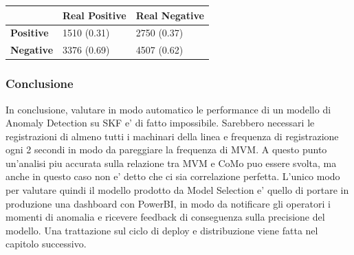 \begin{table}[]
\begin{tabular}{|l|l|l|}
\hline
                  & \textbf{Real Positive} & \textbf{Real Negative} \\ \hline
\textbf{Positive} & 1510 (0.31)            & 2750 (0.37)            \\ \hline
\textbf{Negative} & 3376 (0.69)            & 4507 (0.62)            \\ \hline
\end{tabular}
\end{table}

\subsubsection{Conclusione}
In conclusione, valutare in modo automatico le performance di un modello di Anomaly Detection su SKF e' di fatto impossibile. Sarebbero necessari le registrazioni di almeno tutti i machinari della linea e frequenza di registrazione ogni 2 secondi in modo da pareggiare la frequenza di MVM. A questo punto un'analisi piu accurata sulla relazione tra MVM e CoMo puo essere svolta, ma anche in questo caso non e' detto che ci sia correlazione perfetta.
L'unico modo per valutare quindi il modello prodotto da Model Selection e' quello di portare in produzione una dashboard con PowerBI, in modo da notificare gli operatori i momenti di anomalia e ricevere feedback di conseguenza sulla precisione del modello.
Una trattazione sul ciclo di deploy e distribuzione viene fatta nel capitolo successivo.